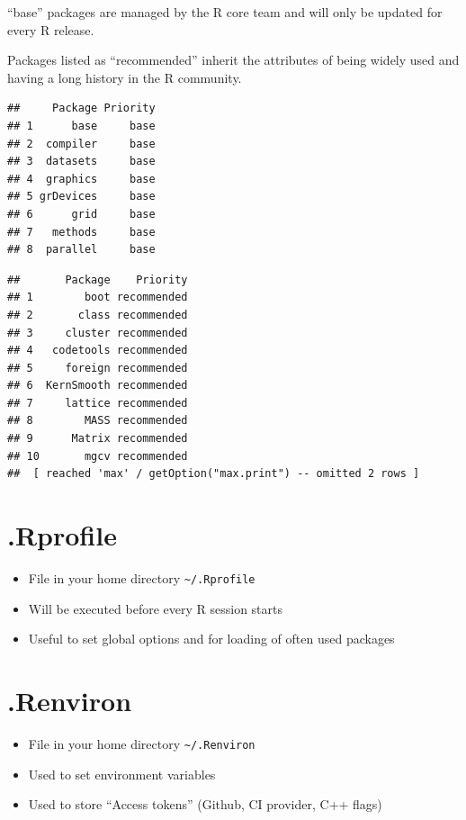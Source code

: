\documentclass[]{book}
\begin{document}
``base'' packages are managed by the R core team and will only be updated for every R release.

Packages listed as ``recommended'' inherit the attributes of being widely used and having a long history in the R community.

\begin{verbatim}
##     Package Priority
## 1      base     base
## 2  compiler     base
## 3  datasets     base
## 4  graphics     base
## 5 grDevices     base
## 6      grid     base
## 7   methods     base
## 8  parallel     base
\end{verbatim}

\begin{verbatim}
##       Package    Priority
## 1        boot recommended
## 2       class recommended
## 3     cluster recommended
## 4   codetools recommended
## 5     foreign recommended
## 6  KernSmooth recommended
## 7     lattice recommended
## 8        MASS recommended
## 9      Matrix recommended
## 10       mgcv recommended
##  [ reached 'max' / getOption("max.print") -- omitted 2 rows ]
\end{verbatim}

\hypertarget{rprofile}{%
\section{.Rprofile}\label{rprofile}}

\begin{itemize}
\item
  File in your home directory \texttt{\textasciitilde{}/.Rprofile}
\item
  Will be executed before every R session starts
\item
  Useful to set global options and for loading of often used packages
\end{itemize}

\hypertarget{renviron}{%
\section{.Renviron}\label{renviron}}

\begin{itemize}
\item
  File in your home directory \texttt{\textasciitilde{}/.Renviron}
\item
  Used to set environment variables
\item
  Used to store ``Access tokens'' (Github, CI provider, C++ flags)
\end{itemize}
\end{document}
